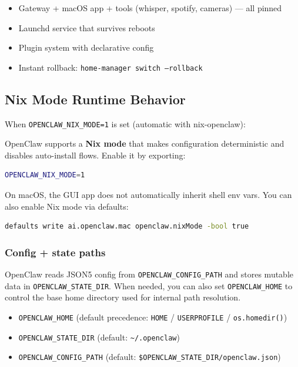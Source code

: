 \begin{itemize}
  \item Gateway + macOS app + tools (whisper, spotify, cameras) — all pinned
  \item Launchd service that survives reboots
  \item Plugin system with declarative config
  \item Instant rollback: \texttt{home-manager switch --rollback}
\end{itemize}


\hrulefill


\subsection{Nix Mode Runtime Behavior}


When \texttt{OPENCLAW\_NIX\_MODE=1} is set (automatic with nix-openclaw):

OpenClaw supports a \textbf{Nix mode} that makes configuration deterministic and disables auto-install flows.
Enable it by exporting:

\begin{lstlisting}[language=bash]
OPENCLAW_NIX_MODE=1
\end{lstlisting}


On macOS, the GUI app does not automatically inherit shell env vars. You can
also enable Nix mode via defaults:

\begin{lstlisting}[language=bash]
defaults write ai.openclaw.mac openclaw.nixMode -bool true
\end{lstlisting}


\subsubsection{Config + state paths}


OpenClaw reads JSON5 config from \texttt{OPENCLAW\_CONFIG\_PATH} and stores mutable data in \texttt{OPENCLAW\_STATE\_DIR}.
When needed, you can also set \texttt{OPENCLAW\_HOME} to control the base home directory used for internal path resolution.

\begin{itemize}
  \item \texttt{OPENCLAW\_HOME} (default precedence: \texttt{HOME} / \texttt{USERPROFILE} / \texttt{os.homedir()})
  \item \texttt{OPENCLAW\_STATE\_DIR} (default: \texttt{\textasciitilde{}/.openclaw})
  \item \texttt{OPENCLAW\_CONFIG\_PATH} (default: \texttt{\$OPENCLAW\_STATE\_DIR/openclaw.json})
\end{itemize}



